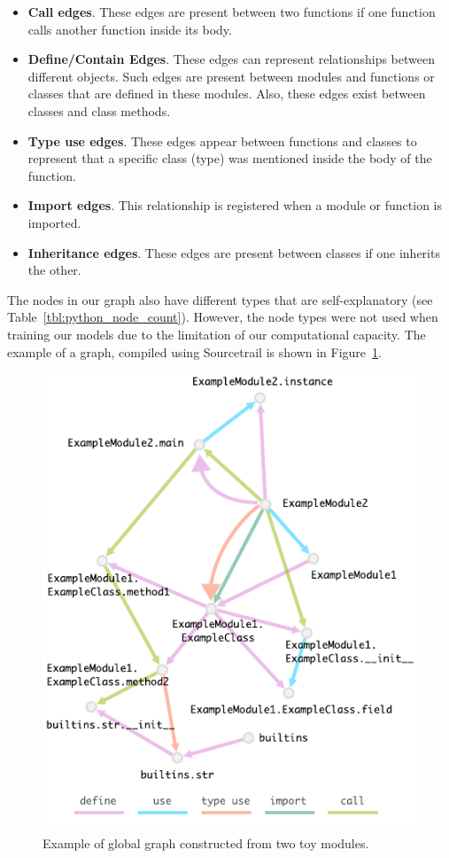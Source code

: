 \documentclass[a4paper,twoside]{article}
\begin{document}
\begin{itemize}
    \item \textbf{Call edges}. These edges are present between two functions if one function calls another function inside its body.
    \item \textbf{Define/Contain Edges}. These edges can represent relationships between different objects. Such edges are present between modules and functions or classes that are defined in these modules. Also, these edges exist between classes and class methods.
    \item \textbf{Type use edges}. These edges appear between functions and classes to represent that a specific class (type) was mentioned inside the body of the function.
    \item \textbf{Import edges}. This relationship is registered when a module or function is imported.
    \item \textbf{Inheritance edges}. These edges are present between classes if one inherits the other. 
\end{itemize}

The nodes in our graph also have different types that are self-explanatory (see Table~\ref{tbl:python_node_count}). However, the node types were not used when training our models due to the limitation of our computational capacity. The example of a graph, compiled using Sourcetrail is shown in Figure~\ref{fig:python_graph}.

\begin{figure}
    \centering
    \includegraphics{python_graph_example.pdf}
    \caption{Example of global graph constructed from two toy modules.}\label{fig:python_graph}
\end{figure}
\end{document}
